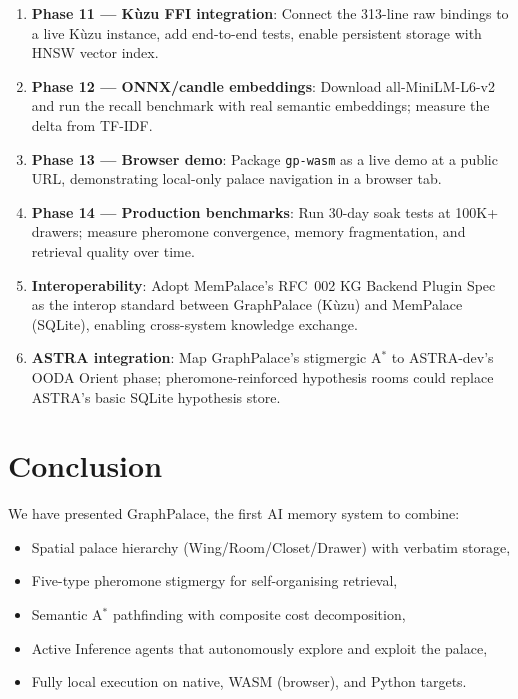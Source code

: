 \documentclass[11pt,a4paper]{article}
\begin{document}
\begin{enumerate}[nosep]
\item \textbf{Phase 11 --- Kùzu FFI integration}: Connect the 313-line raw
      bindings to a live Kùzu instance, add end-to-end tests, enable persistent
      storage with HNSW vector index.
\item \textbf{Phase 12 --- ONNX/candle embeddings}: Download all-MiniLM-L6-v2
      and run the recall benchmark with real semantic embeddings; measure the
      delta from TF-IDF.
\item \textbf{Phase 13 --- Browser demo}: Package \texttt{gp-wasm} as a live
      demo at a public URL, demonstrating local-only palace navigation in a
      browser tab.
\item \textbf{Phase 14 --- Production benchmarks}: Run 30-day soak tests at
      100K+ drawers; measure pheromone convergence, memory fragmentation, and
      retrieval quality over time.
\item \textbf{Interoperability}: Adopt MemPalace's RFC~002 KG Backend Plugin
      Spec as the interop standard between GraphPalace (Kùzu) and MemPalace
      (SQLite), enabling cross-system knowledge exchange.
\item \textbf{ASTRA integration}: Map GraphPalace's stigmergic A$^*$ to
      ASTRA-dev's OODA Orient phase; pheromone-reinforced hypothesis rooms
      could replace ASTRA's basic SQLite hypothesis store.
\end{enumerate}

\section{Conclusion}
\label{sec:conclusion}

We have presented GraphPalace, the first AI memory system to combine:
\begin{itemize}[nosep]
\item Spatial palace hierarchy (Wing/Room/Closet/Drawer) with verbatim storage,
\item Five-type pheromone stigmergy for self-organising retrieval,
\item Semantic A$^*$ pathfinding with composite cost decomposition,
\item Active Inference agents that autonomously explore and exploit the palace,
\item Fully local execution on native, WASM (browser), and Python targets.
\end{itemize}
\end{document}
